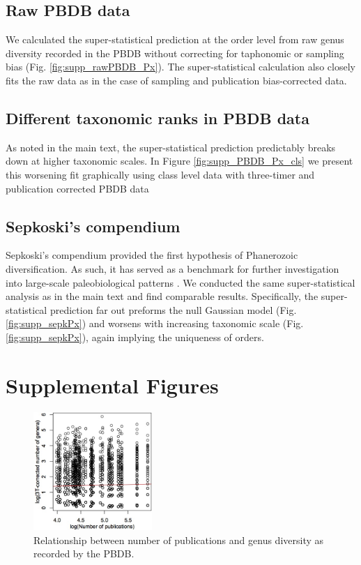\documentclass[12pt]{article}
\let\citep=\cite
\begin{document}
\subsection{Raw PBDB data} \label{sec:rawPBDB}
We calculated the super-statistical prediction at the order level from
raw genus diversity recorded in the PBDB without correcting for
taphonomic or sampling bias (Fig. \ref{fig:supp_rawPBDB_Px}). The
super-statistical calculation also closely fits the raw data as in the
case of sampling and publication bias-corrected data.

\subsection{Different taxonomic ranks in PBDB data}
As noted in the main text, the super-statistical prediction
predictably breaks down at higher taxonomic scales. In Figure
\ref{fig:supp_PBDB_Px_cls} we present this worsening fit graphically
using class level data with three-timer and publication corrected PBDB
data

\subsection{Sepkoski's compendium} \label{sec:suppSepk}
Sepkoski's compendium \citep{sepkoski1992} provided the first
hypothesis of Phanerozoic diversification.  As such, it has served as
a benchmark for further investigation into large-scale paleobiological
patterns \citep{alroy08}.  We conducted the same super-statistical
analysis as in the main text and find comparable results.
Specifically, the super-statistical prediction far out preforms the
null Gaussian model (Fig. \ref{fig:supp_sepkPx}) and worsens with
increasing taxonomic scale (Fig. \ref{fig:supp_sepkPx}), again
implying the uniqueness of orders.

\section*{Supplemental Figures}

\begin{figure}[!hp]
  \centering
  \includegraphics[width=0.4\textwidth]{figs/figSupp_divByPub.jpg}
  \caption[Relationship between number of publications and genus
  diversity]{Relationship between number of publications and genus
    diversity as recorded by the PBDB.}
  \label{fig:divByPub}
\end{figure}
\end{document}
